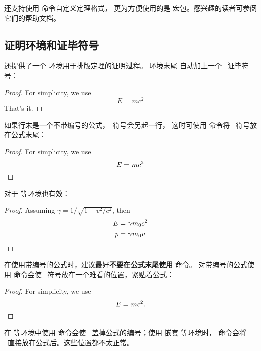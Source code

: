  还支持使用  命令自定义定理格式，
更为方便使用的是  宏包。感兴趣的读者可参阅它们的帮助文档。

\subsection{证明环境和证毕符号}\label{subsec:proof}

 还提供了一个  环境用于排版定理的证明过程。 环境末尾
自动加上一个 \qedsymbol\ 证毕符号：
\begin{example}
\begin{proof}
For simplicity, we use
\[
E=mc^2
\]
That's it.
\end{proof}
\end{example}

如果行末是一个不带编号的公式，\qedsymbol\ 符号会另起一行，
这时可使用  命令将 \qedsymbol\ 符号放在公式末尾：
\begin{example}
\begin{proof}
For simplicity, we use
\[
E=mc^2 \qedhere
\]
\end{proof}
\end{example}

 对于  等环境也有效：
\begin{example}
\begin{proof}
Assuming $\gamma 
= 1/\sqrt{1-v^2/c^2}$, then
\begin{align*}
E &= \gamma m_0 c^2  \\
p &= \gamma m_0v \qedhere
\end{align*}
\end{proof}
\end{example}

在使用带编号的公式时，建议最好\textbf{不要在公式末尾使用}  命令。
对带编号的公式使用  命令会使 \qedsymbol\ 符号放在一个难看的位置，紧贴着公式：
\begin{example}
\begin{proof}
For simplicity, we use
\begin{equation}
E=mc^2.\qedhere
\end{equation}
\end{proof}
\end{example}

在  等环境中使用  命令会使 \qedsymbol\ 盖掉公式的编号；使用  嵌套
 等环境时， 命令会将 \qedsymbol\ 直接放在公式后。这些位置都不太正常。

